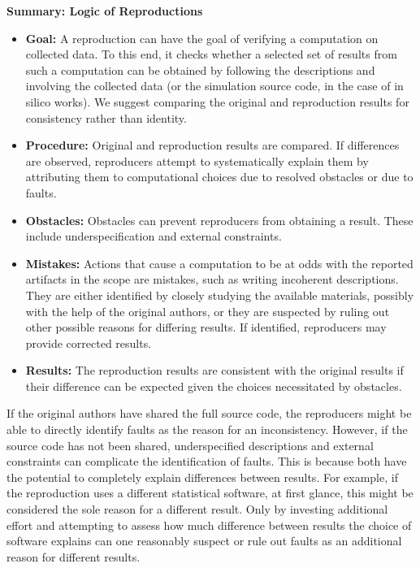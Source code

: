 \documentclass[authordate, meta]{jote-new-article}
\begin{document}
	\begin{rightWide}[Box 1]
	\textbf{Summary: Logic of Reproductions}
	
	\begin{itemize}
	\item \textbf{Goal:} A reproduction can have the goal of verifying a computation on collected data. To this end, it checks whether a selected set of results from such a computation can be obtained by following the descriptions and involving the collected data (or the simulation source code, in the case of in silico works). We suggest comparing the original and reproduction results for consistency rather than identity.
	\item \textbf{Procedure:} Original and reproduction results are compared. If differences are observed, reproducers attempt to systematically explain them by attributing them to computational choices due to resolved obstacles or due to faults.
	\item \textbf{Obstacles:} Obstacles can prevent reproducers from obtaining a result. These include underspecification and external constraints.
	\item \textbf{Mistakes:} Actions that cause a computation to be at odds with the reported artifacts in the scope are mistakes, such as writing incoherent descriptions. They are either identified by closely studying the available materials, possibly with the help of the original authors, or they are suspected by ruling out other possible reasons for differing results. If identified, reproducers may provide corrected results.
	\item \textbf{Results:} The reproduction results are consistent with the original results if their difference can be expected given the choices necessitated by obstacles.
	\end{itemize}

	\end{rightWide}

	If the original authors have shared the full source code, the reproducers might be able to directly identify faults as the reason for an inconsistency. However, if the source code has not been shared, underspecified descriptions and external constraints can complicate the identification of faults. This is because both have the potential to completely explain differences between results. For example, if the reproduction uses a different statistical software, at first glance, this might be considered the sole reason for a different result. Only by investing additional effort and attempting to assess how much difference between results the choice of software explains can one reasonably suspect or rule out faults as an additional reason for different results.
\end{document}
